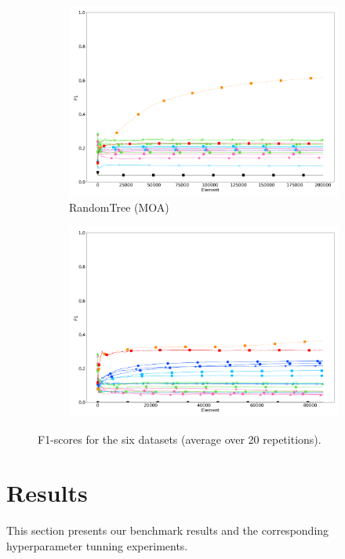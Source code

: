 \begin{figure}
\begin{subfigure}[t]{.49\linewidth}
		\includegraphics[width=\linewidth]{figures/results/dataset_3_f1.png}
		\caption{RandomTree (MOA)}
		\label{fig:f1-dataset_3}
	\end{subfigure}
	\begin{subfigure}[t]{.49\linewidth}
		\includegraphics[width=\linewidth]{figures/results/recofit_6_f1.png}
		\caption{\recofitdataset}
		\label{fig:f1-recofit}
	\end{subfigure}
	\caption{F1-scores for the six datasets (average over 20 repetitions).}
	\label{fig:f1}
\end{figure}

\section{Results}
This section presents our benchmark results and the corresponding
hyperparameter tunning experiments.


